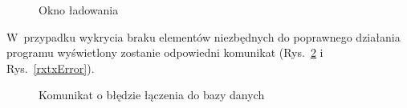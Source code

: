 \begin{figure}[!htb]
\centering 		
  \hspace{2mm}          
\caption{Okno ładowania} 	
\label{splash_screen}
\end{figure}

\noindent W~przypadku wykrycia braku elementów niezbędnych do poprawnego działania programu wyświetlony zostanie odpowiedni komunikat (Rys.~\ref{dbError} i Rys.~\ref{rxtxError}).

\begin{figure}[!htb]
\centering 		
  \hspace{2mm}
\caption{Komunikat o błędzie łączenia do bazy danych} 	
\label{dbError}
\end{figure}

